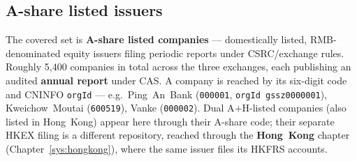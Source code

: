 \documentclass[11pt,a4paper]{report}
\begin{document}
\subsection{A-share listed issuers}
The covered set is \textbf{A-share listed companies} --- domestically listed, RMB-denominated equity issuers
filing periodic reports under CSRC/exchange rules. Roughly 5{,}400 companies in total across the three
exchanges, each publishing an audited \textbf{annual report} under
CAS. A company is reached by its six-digit code and CNINFO \texttt{orgId} --- e.g.\ Ping~An~Bank
(\texttt{000001}, \texttt{orgId gssz0000001}), Kweichow~Moutai (\texttt{600519}), Vanke (\texttt{000002}).
Dual A$+$H-listed companies (also listed in Hong~Kong) appear here through their A-share code; their separate
HKEX filing is a different repository, reached through the \textbf{Hong~Kong} chapter (Chapter~\ref{sys:hongkong}),
where the same issuer files its HKFRS accounts.
\end{document}

